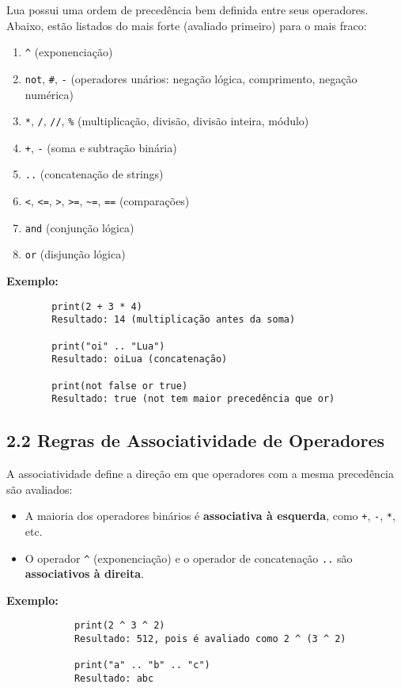 \documentclass[12pt,a4paper]{article}
\begin{document}
	Lua possui uma ordem de precedência bem definida entre seus operadores. Abaixo, estão listados do mais forte (avaliado primeiro) para o mais fraco:
		\begin{enumerate}
			\item \verb|^| (exponenciação)
			\item \verb|not|, \verb|#|, \verb|-| (operadores unários: negação lógica, comprimento, negação numérica)
			\item \verb|*|, \verb|/|, \verb|//|, \verb|%| (multiplicação, divisão, divisão inteira, módulo)
			\item \verb|+|, \verb|-| (soma e subtração binária)
			\item \verb|..| (concatenação de strings)
			\item \verb|<|, \verb|<=|, \verb|>|, \verb|>=|, \verb|~=|, \verb|==| (comparações)
			\item \verb|and| (conjunção lógica)
			\item \verb|or| (disjunção lógica)
		\end{enumerate}
	\textbf{Exemplo:}
	\begin{verbatim}
		print(2 + 3 * 4)  
		Resultado: 14 (multiplicação antes da soma)
		 
		print("oi" .. "Lua") 
		Resultado: oiLua (concatenação)
		  
		print(not false or true) 
		Resultado: true (not tem maior precedência que or)
	\end{verbatim}
	
		\subsection*{2.2  Regras de Associatividade de Operadores}
		A associatividade define a direção em que operadores com a mesma precedência são avaliados:
		\begin{itemize}
		\item A maioria dos operadores binários é \textbf{associativa à esquerda}, como \verb|+|, \verb|-|, \verb|*|, etc.
		\item O operador \verb|^| (exponenciação) e o operador de concatenação \verb|..| são \textbf{associativos à direita}.
		\end{itemize}
		
		\textbf{Exemplo:}
		\begin{verbatim}
			print(2 ^ 3 ^ 2) 
			Resultado: 512, pois é avaliado como 2 ^ (3 ^ 2)
			
			print("a" .. "b" .. "c")
			Resultado: abc
		\end{verbatim}
		
\end{document}
